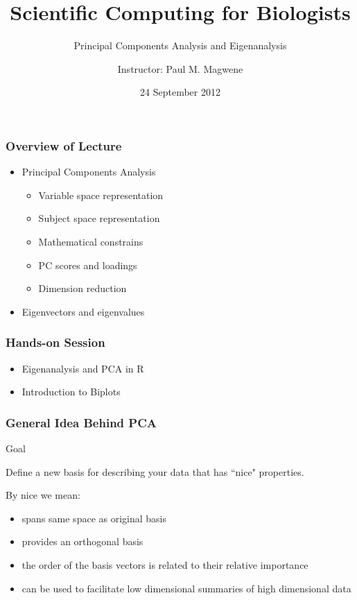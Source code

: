 \documentclass{beamer}
\title{Scientific Computing for Biologists}
\subtitle{Principal Components Analysis and Eigenanalysis} %
\author{Instructor: Paul M. Magwene}
\date{24 September 2012}
\begin{document}
\begin{frame}
\titlepage
\end{frame}

\begin{frame}
  \frametitle{Overview of Lecture}
  
\begin{itemize}
		\item Principal Components Analysis
		\begin{itemize}
			\item Variable space representation
			\item Subject space representation
			\item Mathematical constrains
			\item PC scores and loadings
			\item Dimension reduction			
		\end{itemize}		
		\item Eigenvectors and eigenvalues	
\end{itemize}

\end{frame}

\begin{frame}
  \frametitle{Hands-on Session}
\begin{itemize}
    \item Eigenanalysis and PCA in R
    \item Introduction to Biplots
\end{itemize} 


\end{frame}		





\begin{frame}
  \frametitle{General Idea Behind PCA}


\begin{block}{Goal}

Define a new basis for describing your data that has ``nice" properties.

\end{block}
\medskip

By nice we mean:
\begin{itemize}
	\item spans same space as original basis
	\item provides an orthogonal basis
	\item the order of the basis vectors is related to their relative importance
	\item can be used to facilitate low dimensional summaries of high dimensional data
\end{itemize}


\end{frame}
\end{document}
